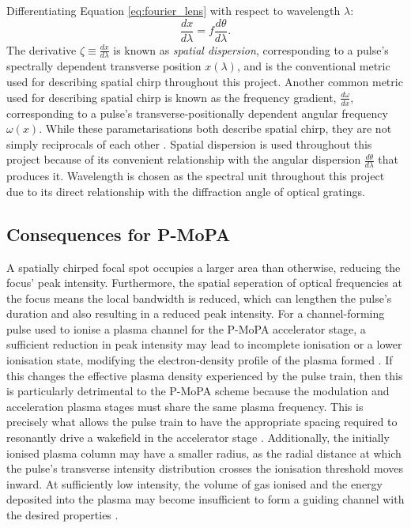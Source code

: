 Differentiating Equation \ref{eq:fourier_lens} with respect
to wavelength $\lambda$:
\begin{equation}
    \frac{dx}{d\lambda}=f\frac{d\theta}{d\lambda}.
    \label{eq:ang_to_spat_chirp}
\end{equation}
The derivative $\zeta\equiv\frac{dx}{d\lambda}$ is known as \emph{spatial dispersion},
corresponding to a pulse's spectrally dependent transverse position $x(\lambda)$, and
is the conventional metric used for describing spatial chirp throughout this 
project. Another common metric used for describing spatial chirp is known as 
the frequency gradient, $\frac{d\omega}{dx}$, corresponding to a pulse's 
transverse-positionally dependent angular frequency $\omega(x)$. While these
parametarisations both describe spatial chirp, they are not simply reciprocals of
each other \cite{gu2004}. Spatial dispersion is used throughout this project because
of its convenient relationship with the angular dispersion $\frac{d\theta}{d\lambda}$
that produces it. Wavelength is chosen as the spectral unit throughout this project
due to its direct relationship with the diffraction angle of optical gratings.



\subsection{Consequences for P-MoPA}
\label{sec:intro-consequences}
A spatially chirped focal spot occupies a larger area than otherwise, reducing the focus' peak
intensity. Furthermore, the spatial seperation of optical frequencies at the focus means
the local bandwidth is reduced, which can lengthen the pulse's duration and also resulting in a reduced 
peak intensity. For a channel-forming pulse used to ionise a plasma channel for the P-MoPA accelerator
stage, a sufficient reduction in peak intensity may lead to incomplete ionisation or a lower ionisation
state, modifying the electron-density profile of the plasma formed \cite{shalloo2018}. If this changes the effective plasma
density experienced by the pulse train, then this is particularly detrimental to the P-MoPA scheme 
because the modulation
and acceleration plasma stages must share the same plasma frequency.
This is precisely what allows the pulse train to have the appropriate spacing required to resonantly
 drive
a wakefield in the accelerator stage \cite{vandewetering2023}.
Additionally, the initially ionised plasma column may have a smaller radius, as the radial distance
 at which the pulse's
transverse intensity distribution crosses the ionisation threshold moves inward. At sufficiently low
intensity, the volume of gas ionised and the energy deposited into the plasma may become insufficient
to form a guiding channel with the desired properties \cite{shalloo2018}.

